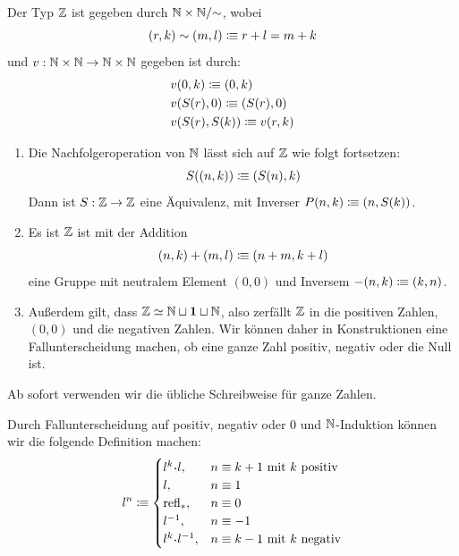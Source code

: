 \begin{definition}
  Der Typ $\Z$\index{$\Z$} ist gegeben durch $\mathbb{N}\times \mathbb{N}/{\sim}$, wobei
  \[
    (r,k)\sim (m,l) \vcentcolon\mspace{-1.2mu}\equiv r+l=m+k
  \]
  und $v:\mathbb{N}\times\mathbb{N} \to \mathbb{N}\times\mathbb{N}$ gegeben ist durch:
  \begin{align*}
    & v(0,k)\vcentcolon\mspace{-1.2mu}\equiv (0,k) \\
    & v(S(r),0)\vcentcolon\mspace{-1.2mu}\equiv (S(r),0) \\
    & v(S(r),S(k))\vcentcolon\mspace{-1.2mu}\equiv v(r,k)
  \end{align*}
\end{definition}

\begin{bemerkung}
  \begin{enumerate}
    \item
      Die Nachfolgeroperation von \(\mathbb{N}\) lässt sich auf $\Z$ wie folgt fortsetzen:
      \[ S((n,k))\vcentcolon\mspace{-1.2mu}\equiv (S(n),k) \]
      Dann ist $S:\mathbb{Z}\to\mathbb{Z}$ eine Äquivalenz, mit Inverser $P(n,k)\vcentcolon\mspace{-1.2mu}\equiv (n,S(k))$.
    \item
      Es ist $\Z$ ist mit der Addition
      \[ (n,k)+(m,l)\vcentcolon\mspace{-1.2mu}\equiv (n+m,k+l) \]
      eine Gruppe mit neutralem Element \((0,0)\) und Inversem \(-(n,k) \vcentcolon\mspace{-1.2mu}\equiv (k,n)\).
    \item
      Außerdem gilt, dass $\mathbb{Z}\simeq \mathbb{N}\sqcup \mathbf{1}\sqcup \mathbb{N}$, also zerfällt $\Z$ in die positiven Zahlen, $(0,0)$ und die negativen Zahlen.
      Wir können daher in Konstruktionen eine Fallunterscheidung machen, ob eine ganze Zahl positiv, negativ oder die Null ist.
  \end{enumerate}
\end{bemerkung}

Ab sofort verwenden wir die übliche Schreibweise für ganze Zahlen.

\begin{definition}
  Durch Fallunterscheidung auf positiv, negativ oder 0 und $\mathbb{N}$-Induktion können wir die folgende
  Definition machen:
  \begin{align*}
    l^{n}\colonequiv 
    \begin{cases}
      l^{k} \kon l, & n \equiv k+1 \text{ mit $k$ positiv} \\
      l, & n \equiv 1 \\
      \refl_\ast, & n \equiv 0 \\
      l^{-1}, & n \equiv -1 \\
      l^k\kon l^{-1}, & n \equiv k-1 \text{ mit $k$ negativ} 
    \end{cases}
  \end{align*}
\end{definition}

